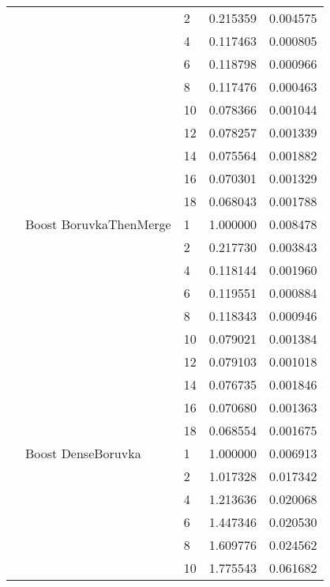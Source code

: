 \begin{tabular}{lllrr}
                      &            & 2  &  0.215359 &  0.004575 \\
                      &            & 4  &  0.117463 &  0.000805 \\
                      &            & 6  &  0.118798 &  0.000966 \\
                      &            & 8  &  0.117476 &  0.000463 \\
                      &            & 10 &  0.078366 &  0.001044 \\
                      &            & 12 &  0.078257 &  0.001339 \\
                      &            & 14 &  0.075564 &  0.001882 \\
                      &            & 16 &  0.070301 &  0.001329 \\
                      &            & 18 &  0.068043 &  0.001788 \\
                      & Boost BoruvkaThenMerge & 1  &  1.000000 &  0.008478 \\
                      &            & 2  &  0.217730 &  0.003843 \\
                      &            & 4  &  0.118144 &  0.001960 \\
                      &            & 6  &  0.119551 &  0.000884 \\
                      &            & 8  &  0.118343 &  0.000946 \\
                      &            & 10 &  0.079021 &  0.001384 \\
                      &            & 12 &  0.079103 &  0.001018 \\
                      &            & 14 &  0.076735 &  0.001846 \\
                      &            & 16 &  0.070680 &  0.001363 \\
                      &            & 18 &  0.068554 &  0.001675 \\
                      & Boost DenseBoruvka & 1  &  1.000000 &  0.006913 \\
                      &            & 2  &  1.017328 &  0.017342 \\
                      &            & 4  &  1.213636 &  0.020068 \\
                      &            & 6  &  1.447346 &  0.020530 \\
                      &            & 8  &  1.609776 &  0.024562 \\
                      &            & 10 &  1.775543 &  0.061682 \\

\end{tabular}
